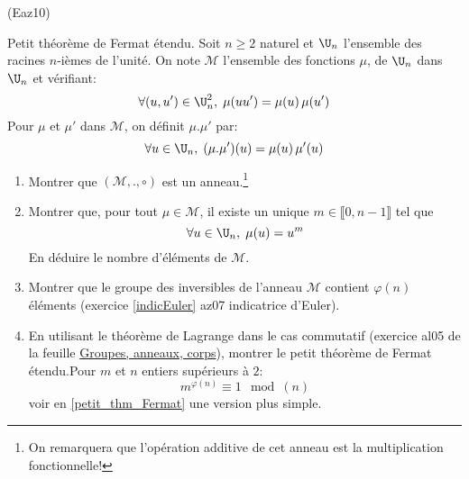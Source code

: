 \begin{tiny}(Eaz10)\end{tiny} Petit théorème de Fermat étendu.\newline \label{petit_thm_Fermat_et}
Soit $n\geq 2$ naturel et $\U_n$ l'ensemble des racines $n$-ièmes de l'unité. On note $\mathcal{M}$ l'ensemble des fonctions $\mu$, de $\U_n$ dans $\U_n$ et  vérifiant:
\begin{displaymath}
\forall (u,u') \in \U_n^2,\; \mu(uu') = \mu(u)\,\mu(u')  
\end{displaymath}
Pour $\mu$ et $\mu'$ dans $\mathcal{M}$, on définit $\mu . \mu'$ par:
\begin{displaymath}
\forall u \in \U_n,\;   (\mu . \mu')(u) = \mu(u)\, \mu'(u)
\end{displaymath}
\begin{enumerate}
  \item Montrer que $(\mathcal{M}, ., \circ)$ est un anneau.\footnote{On remarquera que l'opération additive de cet anneau est la multiplication fonctionnelle!}
  \item Montrer que, pour tout $\mu\in \mathcal{M}$, il existe un unique $m\in \llbracket 0, n-1\rrbracket$ tel que
\begin{displaymath}
  \forall u \in \U_n,\; \mu(u) = u^m
\end{displaymath}
En déduire le nombre d'éléments de $\mathcal{M}$.
  \item Montrer que le groupe des inversibles de l'anneau $\mathcal{M}$ contient $\varphi(n)$ éléments (exercice \ref{indicEuler} az07  indicatrice d'Euler).
  \item En utilisant le théorème de Lagrange dans le cas commutatif (exercice al05 de la feuille \href{\exosurl{fex\_al.pdf}}{Groupes, anneaux, corps}), montrer le petit théorème de Fermat étendu.\newline Pour $m$ et $n$ entiers supérieurs à $2$:
\begin{displaymath}
  m^{\varphi(n)} \equiv 1 \mod(n)
\end{displaymath}
voir en \ref{petit_thm_Fermat} une version plus simple.
\end{enumerate}
